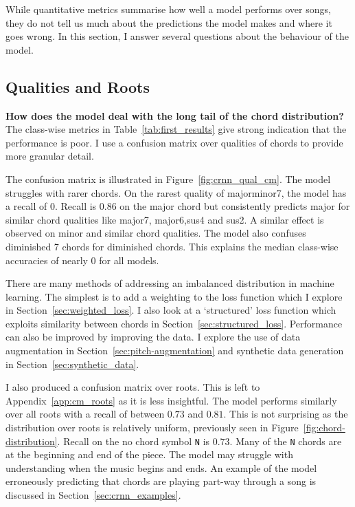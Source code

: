 While quantitative metrics summarise how well a model performs over songs, they do not tell us much about the predictions the model makes and where it goes wrong. In this section, I answer several questions about the behaviour of the model.

\subsection{Qualities and Roots}

\textbf{How does the model deal with the long tail of the chord distribution?} The class-wise metrics in Table~\ref{tab:first_results} give strong indication that the performance is poor. I use a confusion matrix over qualities of chords to provide more granular detail. 

The confusion matrix is illustrated in Figure~\ref{fig:crnn_qual_cm}. The model struggles with rarer chords. On the rarest quality of majorminor7, the model has a recall of $0$. Recall is $0.86$ on the major chord but consistently predicts major for similar chord qualities like major7, major6,sus4 and sus2. A similar effect is observed on minor and similar chord qualities. The model also confuses diminished 7 chords for diminished chords. This explains the median class-wise accuracies of nearly $0$ for all models.

There are many methods of addressing an imbalanced distribution in machine learning. The simplest is to add a weighting to the loss function which I explore in Section~\ref{sec:weighted_loss}. I also look at a `structured' loss function which exploits similarity between chords in Section~\ref{sec:structured_loss}. Performance can also be improved by improving the data. I explore the use of data augmentation in Section~\ref{sec:pitch-augmentation} and synthetic data generation in Section~\ref{sec:synthetic_data}.

I also produced a confusion matrix over roots. This is left to Appendix~\ref{app:cm_roots} as it is less insightful. The model performs similarly over all roots with a recall of between $0.73$ and $0.81$. This is not surprising as the distribution over roots is relatively uniform, previously seen in Figure~\ref{fig:chord-distribution}. Recall on the no chord symbol \texttt{N} is $0.73$. Many of the \texttt{N} chords are at the beginning and end of the piece. The model may struggle with understanding when the music begins and ends. An example of the model erroneously predicting that chords are playing part-way through a song is discussed in Section~\ref{sec:crnn_examples}.


